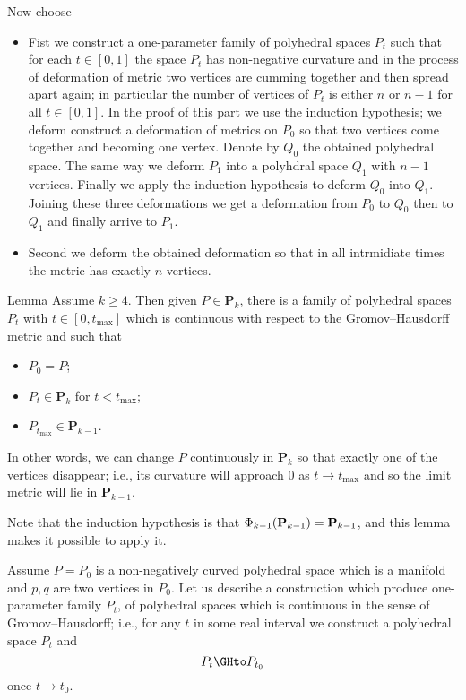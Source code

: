 Now choose 
\begin{itemize}
\item Fist we construct a one-parameter family of polyhedral spaces $P_t$ such that 
for each $t\in [0,1]$ the space $P_t$
has non-negative curvature and in the process of deformation of metric 
two vertices are cumming together and then spread apart again;
in particular the number of vertices 
of $P_t$ is either $n$ or $n-1$ for all $t\in[0,1]$.
In the proof of this part we use the induction hypothesis;
we deform construct a deformation of metrics on $P_0$ so that two vertices come together and becoming one vertex. 
Denote by $Q_0$ the obtained polyhedral space. 
The same way we deform $P_1$ into a polyhdral space $Q_1$ with $n-1$ vertices.
Finally we apply the induction hypothesis to deform $Q_0$ into $Q_1$.
Joining these three deformations we get a deformation from $P_0$ to $Q_0$ then to $Q_1$ and finally arrive to $P_1$.

\item Second we deform the obtained deformation so that in all intrmidiate times the metric has exactly $n$ vertices.
\end{itemize}







\begin{thm}{Lemma}\label{lem:path-to-(k-1)}
Assume $k\ge 4$. 
Then given  $P\in \mathbf{P}_k$, there is a family of polyhedral spaces $P_t$ with $t\in[0,t_{\max}]$
which is continuous with respect to the Gromov--Hausdorff metric 
and such that 
\begin{itemize}
\item $P_0=P$;
\item $P_t\in\mathbf{P}_k$ for $t<t_{\max}$;
\item $P_{t_{\max}}\in \mathbf{P}_{k-1}$.
\end{itemize}
\end{thm}

In other words, we can change $P$ continuously in $\mathbf{P}_k$ so that exactly one of the vertices disappear; i.e., its curvature will approach $0$ as $t\to t_{\max}$ and so the limit metric will lie in $\mathbf{P}_{k-1}$. 

Note that the induction hypothesis is that
$\Phi_{k-1}(\text{\bf P}_{k-1})=\mathbf{P}_{k-1}$,
and this lemma makes it possible to apply it.

Assume $P=P_0$ is
a non-negatively curved polyhedral space which is a manifold
and $p,q$ are two vertices in $P_0$. 
Let us describe a construction
which produce one-parameter family $P_t$,
of polyhedral spaces which is continuous 
in the sense of Gromov--Hausdorff;
i.e., for any $t$ in some real interval 
we construct a polyhedral space $P_t$ 
and
$$P_t\GHto P_{t_0}$$
once $t\to t_0$.



